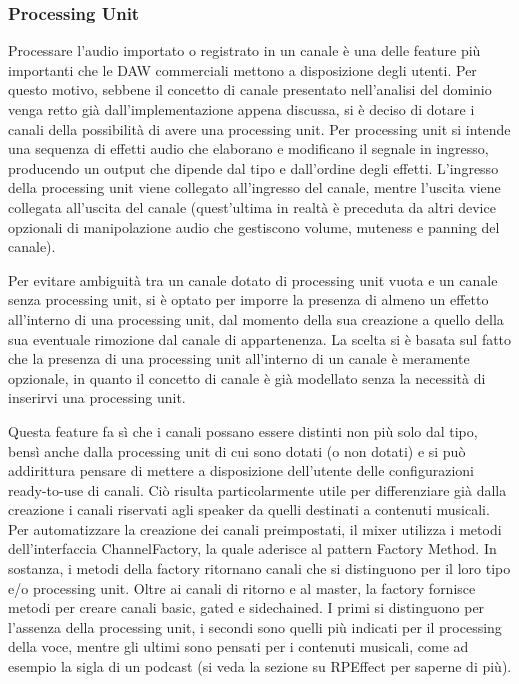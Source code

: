 \documentclass[a4paper,12pt]{report}
\begin{document}
\subsubsection{Processing Unit}
Processare l’audio importato o registrato in un canale è una delle feature più importanti che le DAW commerciali mettono a disposizione degli utenti. Per questo motivo, sebbene il concetto di canale presentato nell’analisi del dominio venga retto già dall'implementazione appena discussa, si è deciso di dotare i canali della possibilità di avere una processing unit. Per processing unit si intende una sequenza di effetti audio che elaborano e modificano il segnale in ingresso, producendo un output che dipende dal tipo e dall’ordine degli effetti. 
L’ingresso della processing unit viene collegato all’ingresso del canale, mentre l’uscita viene collegata all’uscita del canale (quest’ultima in realtà è preceduta da altri device opzionali di manipolazione audio che gestiscono volume, muteness e panning del canale).

Per evitare ambiguità tra un canale dotato di processing unit vuota e un canale senza processing unit, si è optato per imporre la presenza di almeno un effetto all’interno di una processing unit, dal momento della sua creazione a quello della sua eventuale rimozione dal canale di appartenenza.
La scelta si è basata sul fatto che la presenza di una processing unit all’interno di un canale è meramente opzionale, in quanto il concetto di canale è già modellato senza la necessità di inserirvi una processing unit.

Questa feature fa sì che i canali possano essere distinti non più solo dal tipo, bensì anche dalla processing unit di cui sono dotati (o non dotati) e si può addirittura pensare di mettere a disposizione dell’utente delle configurazioni ready-to-use di canali. Ciò risulta particolarmente utile per differenziare già dalla creazione i canali riservati agli speaker da quelli destinati a contenuti musicali.
Per automatizzare la creazione dei canali preimpostati, il mixer utilizza i metodi dell’interfaccia ChannelFactory, la quale aderisce al pattern Factory Method. In sostanza, i metodi della factory ritornano canali che si distinguono per il loro tipo e/o processing unit. Oltre ai canali di ritorno e al master, la factory fornisce metodi per creare canali basic, gated e sidechained. I primi si distinguono per l’assenza della processing unit, i secondi sono quelli più indicati per il processing della voce, mentre gli ultimi sono pensati per i contenuti musicali, come ad esempio la sigla di un podcast (si veda la sezione su RPEffect per saperne di più).
\end{document}
